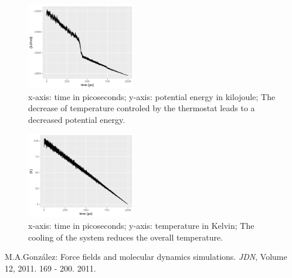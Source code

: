 \documentclass[10pt, a4paper, oneside, twocolumn]{article}
\begin{document}
\begin{figure}[t]
    \centering
    \includegraphics[width=180px]{plots//freezing/freezing_pot_en.png}
    \caption{x-axis: time in picoseconds; y-axis: potential energy in kilojoule; The decrease of temperature controled by the thermostat leads to a decreased potential energy.}
    \label{freezing_pot_en}
\end{figure}

\begin{figure}[t]
    \centering
    \includegraphics[width=180px]{plots//freezing/freezing_temp.png}
    \caption{x-axis: time in picoseconds; y-axis: temperature in Kelvin; The cooling of the system reduces the overall temperature.}
    \label{freezing_temp}
\end{figure}


\begin{thebibliography}{100}
 M.A.González: Force fields and molecular dynamics simulations. \textit{JDN}, Volume 12, 2011. 169 - 200. 2011.
\end{thebibliography}
\end{document}
